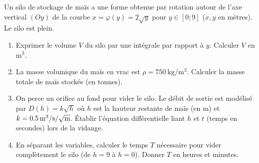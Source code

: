 \documentclass[11pt]{article}
\begin{document}
\begin{exercice}
Un silo de stockage de maïs a une forme obtenue par rotation autour de l'axe vertical $(Oy)$ de la courbe $x = \varphi(y) = 2\sqrt{y}$ pour $y \in [0; 9]$ ($x, y$ en mètres). Le silo est plein.
\begin{enumerate}
    \item Exprimer le volume $V$ du silo par une intégrale par rapport à $y$. Calculer $V$ en $\text{m}^3$.
    \item La masse volumique du maïs en vrac est $\rho = \SI{750}{\kilogram\per\cubic\meter}$. Calculer la masse totale de maïs stockée (en tonnes).
    \item On perce un orifice au fond pour vider le silo. Le débit de sortie est modélisé par $D(h) = k\sqrt{h}$ où $h$ est la hauteur restante de maïs (en m) et $k = \SI{0,5}{\cubic\meter\per\second\per\sqrt{\meter}}$. Établir l'équation différentielle liant $h$ et $t$ (temps en secondes) lors de la vidange.
    \item En séparant les variables, calculer le temps $T$ nécessaire pour vider complètement le silo (de $h=9$ à $h=0$). Donner $T$ en heures et minutes.
\end{enumerate}
\end{exercice}
\end{document}
